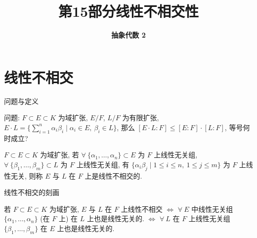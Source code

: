 \everymath{\displaystyle}



\title[线性不相交性]{\texorpdfstring{\LARGE \bfseries 第15部分\quad 线性不相交性}{第15部分 线性不相交性}}
\author[抽象代数 2]{\Large \bfseries 抽象代数 2}
\date{}





\begin{frame}

\titlepage %

\end{frame}


\section[不相交]{线性不相交}


\begin{frame}{问题与定义}

问题: $F \subset E \subset K$ 为域扩张, $E/F$, $L/F$ 为有限扩张,
$E \cdot L = \{ \sum_{i=1}^{n} \alpha_i \beta_i \mid \alpha_i \in E,\
\beta_i \in L \}$, 那么 $[E \cdot L:F] \leq [E:F] \cdot [L:F]$,
等号何时成立?

\pause

\begin{Def}[线性不相交]
$F \subset E \subset K$ 为域扩张, 若 $\forall\ \{\alpha_1, \dots, \alpha_n\}
\subset E$ 为 $F$ 上线性无关组, $\forall\ \{\beta_1, \dots, \beta_m\}
\subset L$ 为 $F$ 上线性无关组, 有
$\{ \alpha_i \beta_j \mid 1 \leq i \leq n,\ 1 \leq j \leq m \}$
为 $F$ 上线性无关, 则称 $E$ 与 $L$ 在 $F$ 上是线性不相交的.
\end{Def}

\end{frame}


\begin{frame}{线性不相交的刻画}

\begin{lem}[线性不相交的刻画]
若 $F \subset E \subset K$ 为域扩张, $E$ 与 $L$ 在 $F$ 上线性不相交
$\iff$ $\forall\ E$ 中线性无关组 $\{ \alpha_1, \dots, \alpha_n \}$ (在 $F$ 上)
在 $L$ 上也是线性无关的.
$\iff$ $\forall\ L$ 在 $F$ 上线性无关组 $\{ \beta_1, \dots, \beta_m \}$
在 $E$ 上也是线性无关的.
\end{lem}

\end{frame}

